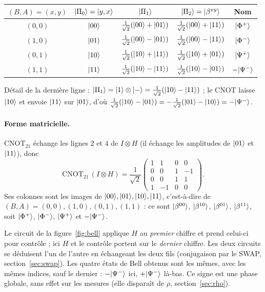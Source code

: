 \begin{center}
\renewcommand{\arraystretch}{1.7}
\begin{tabular}{@{}ccccc@{}}
\toprule
$(B,A)=(x,y)$ & $|\Pi_0\rangle=|y,x\rangle$ & $|\Pi_1\rangle$ & $|\Pi_2\rangle=|\beta^{xy}\rangle$ & Nom \\
\midrule
$(0,0)$ & $|00\rangle$ & $\frac{1}{\sqrt2}(|00\rangle+|01\rangle)$ & $\frac{1}{\sqrt2}(|00\rangle+|11\rangle)$ & $|\Phi^+\rangle$ \\
$(1,0)$ & $|01\rangle$ & $\frac{1}{\sqrt2}(|00\rangle-|01\rangle)$ & $\frac{1}{\sqrt2}(|00\rangle-|11\rangle)$ & $|\Phi^-\rangle$ \\
$(0,1)$ & $|10\rangle$ & $\frac{1}{\sqrt2}(|10\rangle+|11\rangle)$ & $\frac{1}{\sqrt2}(|10\rangle+|01\rangle)$ & $|\Psi^+\rangle$ \\
$(1,1)$ & $|11\rangle$ & $\frac{1}{\sqrt2}(|10\rangle-|11\rangle)$ & $\frac{1}{\sqrt2}(|10\rangle-|01\rangle)$ & $-|\Psi^-\rangle$ \\
\bottomrule
\end{tabular}
\end{center}
Détail de la dernière ligne : $|\Pi_1\rangle=|1\rangle\otimes|-\rangle=\frac{1}{\sqrt2}(|10\rangle-|11\rangle)$ ;
le CNOT laisse $|10\rangle$ et envoie $|11\rangle$ sur $|01\rangle$, d'où
$\frac{1}{\sqrt2}(|10\rangle-|01\rangle)=-\frac{1}{\sqrt2}(|01\rangle-|10\rangle)=-|\Psi^-\rangle$.

\paragraph{Forme matricielle.} $\mathrm{CNOT}_{21}$ échange les lignes $2$ et $4$ de
$I\otimes H$ (il échange les amplitudes de $|01\rangle$ et $|11\rangle$), donc
\[
  \mathrm{CNOT}_{21}\,(I\otimes H)=\frac{1}{\sqrt2}\begin{pmatrix}
    1 & 1 & 0 & 0\\ 0 & 0 & 1 & -1\\ 0 & 0 & 1 & 1\\ 1 & -1 & 0 & 0
  \end{pmatrix}.
\]
Ses colonnes sont les images de $|00\rangle,|01\rangle,|10\rangle,|11\rangle$, c'est-à-dire de
$(B,A)=(0,0),(1,0),(0,1),(1,1)$ : ce sont $|\beta^{00}\rangle$, $|\beta^{10}\rangle$,
$|\beta^{01}\rangle$, $|\beta^{11}\rangle$, soit $|\Phi^+\rangle$, $|\Phi^-\rangle$, $|\Psi^+\rangle$
et $-|\Psi^-\rangle$.

\begin{remarque}
Le circuit de la figure~\ref{fig:bell} applique $H$ au \emph{premier} chiffre et prend celui-ci
pour contrôle ; ici $H$ et le contrôle portent sur le \emph{dernier} chiffre. Les deux
circuits se déduisent l'un de l'autre en échangeant les deux fils (conjugaison par le SWAP,
section~\ref{sec:swap}). Les quatre états de Bell obtenus sont les mêmes, avec les mêmes
indices, sauf le dernier : $-|\Psi^-\rangle$ ici, $+|\Psi^-\rangle$ là-bas. Ce signe est une phase
globale, sans effet sur les mesures (elle disparaît de $\rho$, section~\ref{sec:rho}).
\end{remarque}

